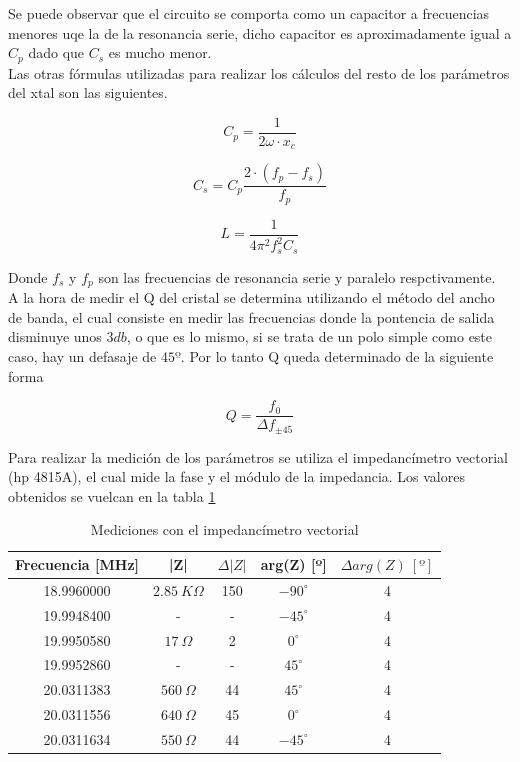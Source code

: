 \documentclass[a4paper,10pt]{article}
\begin{document}
		\indent Se puede observar que el circuito se comporta como un capacitor
		a frecuencias menores uqe la de la resonancia serie, dicho capacitor es 
		aproximadamente igual a $C_p$ dado que $C_s$ es mucho menor. \\
		\indent Las otras fórmulas utilizadas para realizar los cálculos del 
		resto de los parámetros del xtal son las siguientes.
	
		\begin{equation} \label{eq001}
			C_p = \frac{1}{2\omega\cdot x_c}		
		\end{equation}
		
		\begin{equation} \label{eq002}
			C_s = C_p \frac{2\cdot(f_p - f_s)}{f_p}
		\end{equation}

		\begin{equation} \label{eq003}
			L = \frac{1}{4\pi^2f_s^2C_s}
		\end{equation}

		\indent Donde $f_s$ y $f_p$ son las frecuencias de resonancia serie y 
		paralelo respctivamente. \\
		\indent A la hora de medir el Q del cristal se determina utilizando el 
		método del ancho de banda, el cual consiste en medir las frecuencias 
		donde la pontencia de salida disminuye unos $3db$, o que es lo mismo, 
		si se trata de un polo simple como este caso, hay un defasaje de $45º$.
		Por lo tanto Q queda determinado de la siguiente forma
		
		\begin{equation} \label{eq004}
			Q = \frac{f_0}{\Delta f_{\pm45}}
		\end{equation}
		
		\indent Para realizar la medición de los parámetros se utiliza el 
		impedancímetro vectorial (hp 4815A), el cual mide la fase y el módulo de
		la impedancia. Los valores obtenidos se vuelcan en la tabla \ref{tab003}
		
		\begin{table}[!htp]
			\centering
			\begin{tabular}{|c|c|c|c|c|}
				\hline
				Frecuencia [MHz] & |Z| & $\Delta |Z|$ & arg(Z) [º] & 
				$\Delta arg(Z)~[º]$ \\
				\hline
				18.9960000 & $2.85~K\Omega$ & 150 & $-90^{\circ}$ & 4 \\
				\hline
				19.9948400 & - & - & $-45^{\circ}$ & 4 \\ 
				\hline
				19.9950580 & $17~\Omega$ & 2 & $0^{\circ}$ & 4 \\
				\hline
				19.9952860 & - & - & $45^{\circ}$ & 4 \\ 
				\hline									
				20.0311383 & $560~\Omega$ & 44 & $45^{\circ}$ & 4 \\
				\hline									
				20.0311556 & $640~\Omega$ & 45 & $0^{\circ}$ & 4 \\
				\hline									
				20.0311634 & $550~\Omega$ & 44 & $-45^{\circ}$ & 4 \\
				\hline									
			\end{tabular}
			\caption{Mediciones con el impedancímetro vectorial} \label{tab003}
		\end{table}	
		
\end{document}
